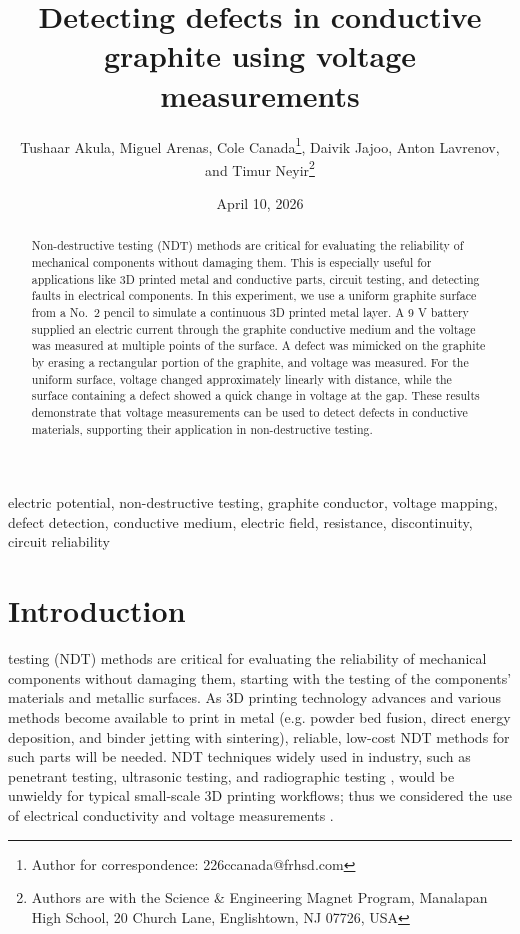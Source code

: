 \documentclass[10pt,journal,twoside]{IEEEtran} %
\title{Detecting defects in conductive graphite using voltage measurements}
\author{Tushaar Akula, Miguel Arenas, Cole Canada\thanks{Author for correspondence: 226ccanada@frhsd.com}, Daivik Jajoo, Anton Lavrenov, and Timur Neyir\thanks{Authors are with the Science \& Engineering Magnet Program, Manalapan High School, 20 Church Lane, Englishtown, NJ 07726, USA}}
\date{April 10, 2026}
\newcommand{\keywords}{electric potential, non-destructive testing, graphite conductor, voltage mapping, defect detection, conductive medium, electric field, resistance, discontinuity, circuit reliability}
\begin{document}
\maketitle

\begin{abstract}
Non-destructive testing (NDT) methods are critical for evaluating the reliability of mechanical components without damaging them. This is especially useful for applications like 3D printed metal and conductive parts, circuit testing, and detecting faults in electrical components. In this experiment, we use a uniform graphite surface from a No.~2 pencil to simulate a continuous 3D printed metal layer. A 9 V battery supplied an electric current through the graphite conductive medium and the voltage was measured at multiple points of the surface. A defect was mimicked on the graphite by erasing a rectangular portion of the graphite, and voltage was measured. For the uniform surface, voltage changed approximately linearly with distance, while the surface containing a defect showed a quick change in voltage at the gap. These results demonstrate that voltage measurements can be used to detect defects in conductive materials, supporting their application in non-destructive testing.
\end{abstract}

\begin{IEEEkeywords}
\keywords
\end{IEEEkeywords}

\section{Introduction}

 testing (NDT) methods are critical for evaluating the reliability of mechanical components without damaging them, starting with the testing of the components’ materials and metallic surfaces. As 3D printing technology advances and various methods become available to print in metal (e.g. powder bed fusion, direct energy deposition, and binder jetting with sintering), reliable, low-cost NDT methods for such parts will be needed. NDT techniques widely used in industry, such as penetrant testing, ultrasonic testing, and radiographic testing \cite{davis:2004:nondestructive,cawley:2001:nondestructive}, would be unwieldy for typical small-scale 3D printing workflows; thus we considered the use of electrical conductivity and voltage measurements \cite{loke:2013:recent,hauptmann:2018:revealing}. 
\end{document}
